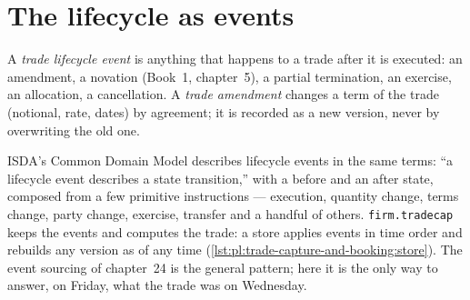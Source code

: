 \section{The lifecycle as events}

\begin{definition}\label{def:pl:trade-capture-and-booking:event}
A \emph{trade lifecycle event} is anything that happens to a trade after it is executed: an amendment, a
novation (Book~1, chapter~5), a partial termination, an exercise, an allocation, a cancellation. A \emph{trade amendment}
changes a term of the trade (notional, rate, dates) by agreement; it is recorded as a new version, never by overwriting the old one.
\end{definition}

ISDA's Common Domain Model describes lifecycle events in the same terms: ``a lifecycle event describes a state transition,'' with a
before and an after state, composed from a few primitive instructions --- execution, quantity change, terms change, party change, exercise,
transfer and a handful of others. \texttt{firm.tradecap} keeps the events and computes the trade: a store applies events in time order and
rebuilds any version as of any time (\cref{lst:pl:trade-capture-and-booking:store}). The event sourcing of chapter~24 is the general
pattern; here it is the only way to answer, on Friday, what the trade was on Wednesday.

\label{lst:pl:trade-capture-and-booking:store}

\label{lst:pl:trade-capture-and-booking:step}

